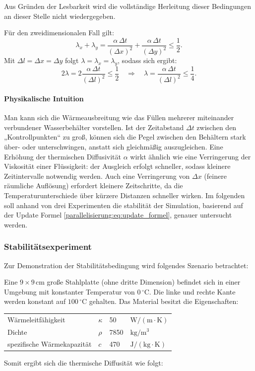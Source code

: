 Aus Gründen der Lesbarkeit wird die vollständige Herleitung dieser Bedingungen an dieser Stelle nicht wiedergegeben.

Für den zweidimensionalen Fall gilt:
\begin{equation}
	\lambda_x + \lambda_y =
	\frac{\alpha \, \Delta t}{(\Delta x)^2} +
	\frac{\alpha \, \Delta t}{(\Delta y)^2} \leq \frac{1}{2}.
\end{equation}
Mit \(\Delta l = \Delta x = \Delta y\) folgt \(\lambda = \lambda_x = \lambda_y\), sodass sich ergibt:
\begin{equation}
	2\lambda = 2 \frac{\alpha \, \Delta t}{(\Delta l)^2} \leq \frac{1}{2}
	\quad \Rightarrow \quad
	\lambda = \frac{\alpha \, \Delta t}{(\Delta l)^2} \leq \frac{1}{4}.
\end{equation}

\paragraph{Physikalische Intuition}  
Man kann sich die Wärmeausbreitung wie das Füllen mehrerer miteinander verbundener Wasserbehälter vorstellen.  
Ist der Zeitabstand \(\Delta t\) zwischen den „Kontrollpunkten“ zu groß, können sich die Pegel zwischen den Behältern stark über- oder unterschwingen, anstatt sich gleichmäßig auszugleichen.  
Eine Erhöhung der thermischen Diffusivität \(\alpha\) wirkt ähnlich wie eine Verringerung der Viskosität einer Flüssigkeit: der Ausgleich erfolgt schneller, sodass kleinere Zeitintervalle notwendig werden.  
Auch eine Verringerung von \(\Delta x\) (feinere räumliche Auflösung) erfordert kleinere Zeitschritte, da die Temperaturunterschiede über kürzere Distanzen schneller wirken.
Im folgenden soll anhand von drei Experimenten die stabilität der Simulation, basierend auf der Update Formel  \eqref{parallelisierung:eq:update_formel}, genauer untersucht werden.

\subsubsection{Stabilitätsexperiment}

Zur Demonstration der Stabilitätsbedingung wird folgendes Szenario betrachtet:

Eine \(9 \times 9 \, \mathrm{cm}\) große Stahlplatte (ohne dritte Dimension) befindet sich in einer Umgebung mit konstanter Temperatur von \(0\,^{\circ}\mathrm{C}\).  
Die linke und rechte Kante werden konstant auf \(100\,^{\circ}\mathrm{C}\) gehalten.  
Das Material besitzt die Eigenschaften:
\begin{center}
	\begin{tabular}{llll}
		Wärmeleitfähigkeit & \(\kappa\) & 50 &
		\(\mathrm{W/(m \cdot K)}\) \\
		Dichte & \(\rho\)   &  7850 & \(\mathrm{kg/m^3}\) \\
		spezifische Wärmekapazität & \(c\) &  470 & \(\mathrm{J/(kg \cdot K)}\)
	\end{tabular}
\end{center}
Somit ergibt sich die thermische Diffusität wie folgt:


